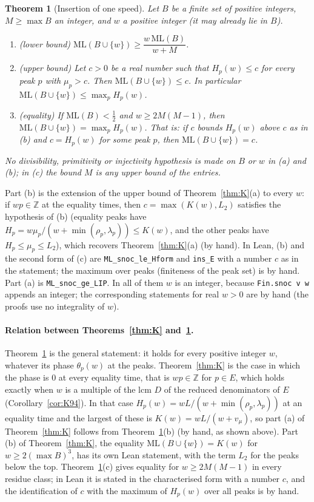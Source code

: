 \documentclass[11pt]{article}
\newtheorem{theorem}{Theorem}[section]
\theoremstyle{definition}
\theoremstyle{remark}
\newcommand{\ML}{\mathrm{ML}}
\newcommand{\ZZ}{\mathbb{Z}}
\begin{document}
\begin{theorem}[Insertion of one speed]\label{thm:INS}
Let $B$ be a finite set of positive integers, $M\ge\max B$ an integer, and $w$ a positive integer (it may already lie in $B$).
\begin{enumerate}[label=(\alph*),nosep]
\item (lower bound) $\ML(B\cup\{w\})\ge\dfrac{w\,\ML(B)}{w+M}$.
\item (upper bound) Let $c>0$ be a real number such that $H_p(w)\le c$ for every peak $p$ with $\mu_p>c$. Then $\ML(B\cup\{w\})\le c$. In particular $\ML(B\cup\{w\})\le\max_pH_p(w)$.
\item (equality) If $\ML(B)<\frac12$ and $w\ge2M(M-1)$, then $\ML(B\cup\{w\})=\max_pH_p(w)$. That is: if $c$ bounds $H_p(w)$ above $c$ as in (b) and $c=H_p(w)$ for some peak $p$, then $\ML(B\cup\{w\})=c$.
\end{enumerate}
No divisibility, primitivity or injectivity hypothesis is made on $B$ or $w$ in (a) and (b); in (c) the bound $M$ is any upper bound of the entries.
\end{theorem}
Part (b) is the extension of the upper bound of Theorem~\ref{thm:K}(a) to every $w$: if $wp\in\ZZ$ at the equality times, then $c=\max(K(w),L_2)$ satisfies the hypothesis of (b) (equality peaks have $H_p=w\mu_p/(w+\min(\rho_p,\lambda_p))\le K(w)$, and the other peaks have $H_p\le\mu_p\le L_2$), which recovers Theorem~\ref{thm:K}(a) (by hand). In Lean, (b) and the second form of (c) are \texttt{ML\_snoc\_le\_Hform} and \texttt{ins\_E} with a number $c$ as in the statement; the maximum over peaks (finiteness of the peak set) is by hand. Part (a) is \texttt{ML\_snoc\_ge\_LIP}. In all of them $w$ is an integer, because \texttt{Fin.snoc v w} appends an integer; the corresponding statements for real $w>0$ are by hand (the proofs use no integrality of $w$).

\paragraph{Relation between Theorems~\ref{thm:K} and~\ref{thm:INS}.}
Theorem~\ref{thm:INS} is the general statement: it holds for every positive integer $w$, whatever its phase $\theta_p(w)$ at the peaks. Theorem~\ref{thm:K} is the case in which the phase is $0$ at every equality time, that is $wp\in\ZZ$ for $p\in E$, which holds exactly when $w$ is a multiple of the lcm $D$ of the reduced denominators of $E$ (Corollary~\ref{cor:K94}). In that case $H_p(w)=wL/(w+\min(\rho_p,\lambda_p))$ at an equality time and the largest of these is $K(w)=wL/(w+v_\mu)$, so part (a) of Theorem~\ref{thm:K} follows from Theorem~\ref{thm:INS}(b) (by hand, as shown above). Part (b) of Theorem~\ref{thm:K}, the equality $\ML(B\cup\{w\})=K(w)$ for $w\ge2(\max B)^3$, has its own Lean statement, with the term $L_2$ for the peaks below the top. Theorem~\ref{thm:INS}(c) gives equality for $w\ge2M(M-1)$ in every residue class; in Lean it is stated in the characterised form with a number $c$, and the identification of $c$ with the maximum of $H_p(w)$ over all peaks is by hand.
\end{document}
